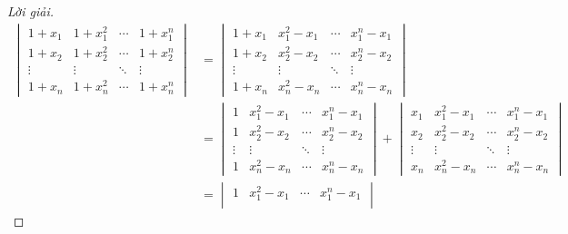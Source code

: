 \documentclass[class=linearalgebra,crop=false]{standalone}
\begin{document}
\begin{proof}[Lời giải]
    \begingroup
    \allowdisplaybreaks
    \begin{align*}
        \begin{vmatrix}
            1 + x_{1} & 1 + x_{1}^{2} & \cdots & 1 + x_{1}^{n} \\
            1 + x_{2} & 1 + x_{2}^{2} & \cdots & 1 + x_{2}^{n} \\
            \vdots    & \vdots        & \ddots & \vdots        \\
            1 + x_{n} & 1 + x_{n}^{2} & \cdots & 1 + x_{n}^{n}
        \end{vmatrix}
         & =
        \begin{vmatrix}
            1 + x_{1} & x_{1}^{2} - x_{1} & \cdots & x_{1}^{n} - x_{1} \\
            1 + x_{2} & x_{2}^{2} - x_{2} & \cdots & x_{2}^{n} - x_{2} \\
            \vdots    & \vdots            & \ddots & \vdots            \\
            1 + x_{n} & x_{n}^{2} - x_{n} & \cdots & x_{n}^{n} - x_{n}
        \end{vmatrix}                                   \\
         & =
        \begin{vmatrix}
            1      & x_{1}^{2} - x_{1} & \cdots & x_{1}^{n} - x_{1} \\
            1      & x_{2}^{2} - x_{2} & \cdots & x_{2}^{n} - x_{2} \\
            \vdots & \vdots            & \ddots & \vdots            \\
            1      & x_{n}^{2} - x_{n} & \cdots & x_{n}^{n} - x_{n}
        \end{vmatrix}
        +
        \begin{vmatrix}
            x_{1}  & x_{1}^{2} - x_{1} & \cdots & x_{1}^{n} - x_{1} \\
            x_{2}  & x_{2}^{2} - x_{2} & \cdots & x_{2}^{n} - x_{2} \\
            \vdots & \vdots            & \ddots & \vdots            \\
            x_{n}  & x_{n}^{2} - x_{n} & \cdots & x_{n}^{n} - x_{n}
        \end{vmatrix}                                      \\
         & =
        \begin{vmatrix}
            1      & x_{1}^{2} - x_{1} & \cdots & x_{1}^{n} - x_{1} \\

\end{vmatrix}
\end{align*}
\end{proof}
\end{document}
